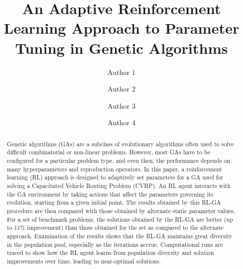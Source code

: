 \documentclass[acmsmall]{acmart}
\begin{document}
\title{An Adaptive Reinforcement Learning Approach to Parameter Tuning in Genetic Algorithms}


\author{Author 1}
\author{Author 2}
\authornotemark[1]

\author{Author 3}

\author{Author 4}

\renewcommand{\shortauthors}{Trovato and Tobin, et al.}

\begin{abstract}
    Genetic algorithms (GAs) are a subclass of evolutionary algorithms often used to solve difficult combinatorial or non-linear problems. However, most GAs have to be configured for a particular problem type, and even then, the performance depends on many hyperparameters and reproduction operators. 
    In this paper, a reinforcement learning (RL) approach is designed to adaptively set parameters for a GA used for solving a Capacitated Vehicle Routing Problem (CVRP). An RL agent interacts with the GA environment by taking actions that affect the parameters governing its evolution, starting from a given initial point. The results obtained by this RL-GA procedure are then compared with those obtained by alternate static parameter values. For a set of benchmark problems, the solutions obtained by the RL-GA are better (up to 11\% improvement) than those obtained for the set as compared to the alternate approach. Examination of the results shows that the RL-GA maintains great diversity in the population pool, especially as the iterations accrue. Computational runs are traced to show how the RL agent learns from population diversity and solution improvements over time, leading to near-optimal solutions.
\end{abstract}
\end{document}
